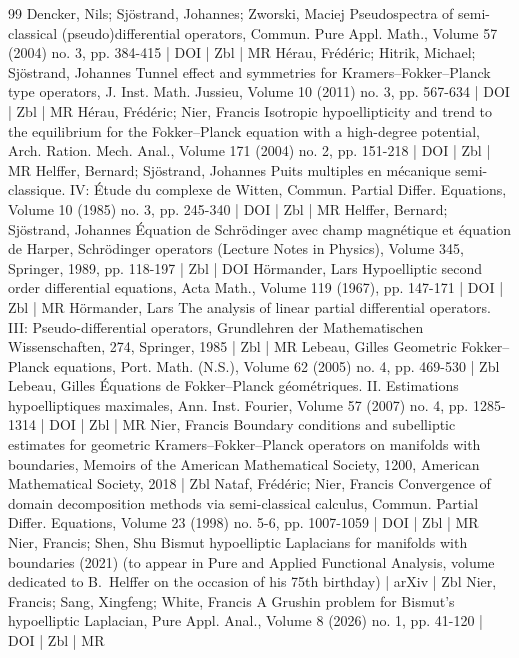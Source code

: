 \documentclass[10pt]{amsart}
\theoremstyle{definition}\newtheorem{defi}[theo]{Definition}\newtheorem{rema}[theo]{Remark}\newtheorem{exam}[theo]{Example}\newtheorem{exem}[theo]{Example}\newtheorem{nota}[theo]{Notation}
\begin{document}
\begin{thebibliography}{99}
 Dencker, Nils; Sjöstrand, Johannes; Zworski, Maciej Pseudospectra of semi-classical (pseudo)differential operators, Commun. Pure Appl. Math., Volume 57 (2004) no. 3, pp. 384-415 | DOI | Zbl | MR
 Hérau, Frédéric; Hitrik, Michael; Sjöstrand, Johannes Tunnel effect and symmetries for Kramers–Fokker–Planck type operators, J. Inst. Math. Jussieu, Volume 10 (2011) no. 3, pp. 567-634 | DOI | Zbl | MR
 Hérau, Frédéric; Nier, Francis Isotropic hypoellipticity and trend to the equilibrium for the Fokker–Planck equation with a high-degree potential, Arch. Ration. Mech. Anal., Volume 171 (2004) no. 2, pp. 151-218 | DOI | Zbl | MR
 Helffer, Bernard; Sjöstrand, Johannes Puits multiples en mécanique semi-classique. IV: Étude du complexe de Witten, Commun. Partial Differ. Equations, Volume 10 (1985) no. 3, pp. 245-340 | DOI | Zbl | MR
 Helffer, Bernard; Sjöstrand, Johannes Équation de Schrödinger avec champ magnétique et équation de Harper, Schrödinger operators (Lecture Notes in Physics), Volume 345, Springer, 1989, pp. 118-197 | Zbl | DOI
 Hörmander, Lars Hypoelliptic second order differential equations, Acta Math., Volume 119 (1967), pp. 147-171 | DOI | Zbl | MR
 Hörmander, Lars The analysis of linear partial differential operators. III: Pseudo-differential operators, Grundlehren der Mathematischen Wissenschaften, 274, Springer, 1985 | Zbl | MR
 Lebeau, Gilles Geometric Fokker–Planck equations, Port. Math. (N.S.), Volume 62 (2005) no. 4, pp. 469-530 | Zbl
 Lebeau, Gilles Équations de Fokker–Planck géométriques. II. Estimations hypoelliptiques maximales, Ann. Inst. Fourier, Volume 57 (2007) no. 4, pp. 1285-1314 | DOI | Zbl | MR
 Nier, Francis Boundary conditions and subelliptic estimates for geometric Kramers–Fokker–Planck operators on manifolds with boundaries, Memoirs of the American Mathematical Society, 1200, American Mathematical Society, 2018 | Zbl
 Nataf, Frédéric; Nier, Francis Convergence of domain decomposition methods via semi-classical calculus, Commun. Partial Differ. Equations, Volume 23 (1998) no. 5-6, pp. 1007-1059 | DOI | Zbl | MR
 Nier, Francis; Shen, Shu Bismut hypoelliptic Laplacians for manifolds with boundaries (2021) (to appear in Pure and Applied Functional Analysis, volume dedicated to B. Helffer on the occasion of his 75th birthday) | arXiv | Zbl
 Nier, Francis; Sang, Xingfeng; White, Francis A Grushin problem for Bismut’s hypoelliptic Laplacian, Pure Appl. Anal., Volume 8 (2026) no. 1, pp. 41-120 | DOI | Zbl | MR

\end{thebibliography}
\end{document}
